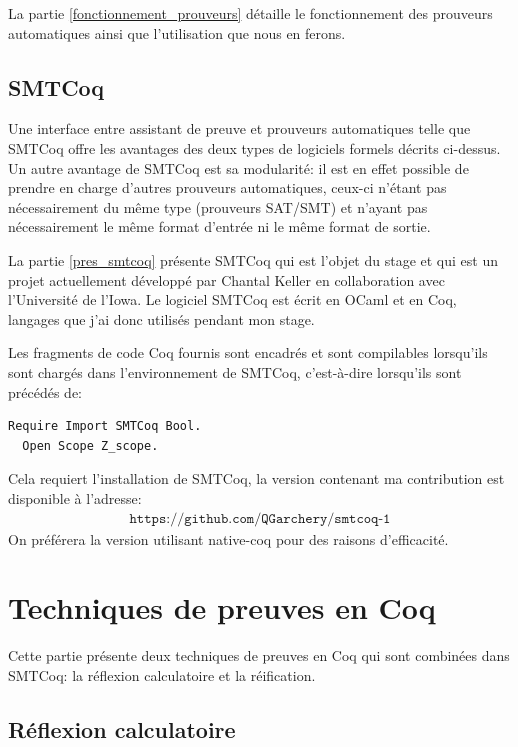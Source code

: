 \documentclass[11pt]{article}
\begin{document}
La partie \ref{fonctionnement_prouveurs} détaille le fonctionnement des prouveurs automatiques ainsi que l'utilisation que nous en ferons.


\subsection{SMTCoq}

Une interface entre assistant de preuve et prouveurs automatiques telle que SMTCoq offre les avantages des deux types de logiciels formels décrits ci-dessus. Un autre avantage de SMTCoq est sa modularité: il est en effet possible de prendre en charge d'autres prouveurs automatiques, ceux-ci n'étant pas nécessairement du même type (prouveurs SAT/SMT) et n'ayant pas nécessairement le même format d'entrée ni le même format de sortie. \medbreak


La partie \ref{pres_smtcoq} présente SMTCoq qui est l'objet du stage et qui est un projet actuellement développé par Chantal Keller en collaboration avec l'Université de l'Iowa. Le logiciel SMTCoq est écrit en OCaml et en Coq, langages que j'ai donc utilisés pendant mon stage. \medbreak

Les fragments de code Coq fournis sont encadrés et sont compilables lorsqu'ils sont chargés dans l'environnement de SMTCoq, c'est-à-dire lorsqu'ils sont précédés de:
\begin{lstlisting}[frame=single]
  Require Import SMTCoq Bool.
  Open Scope Z_scope.
\end{lstlisting}
Cela requiert l'installation de SMTCoq, la version contenant ma contribution est disponible à l'adresse:
\begin{align*}
    \texttt{https://github.com/QGarchery/smtcoq-1}
\end{align*}
On préférera la version utilisant native-coq \cite{native-coq} pour des raisons d'efficacité.


\newpage

\section{Techniques de preuves en Coq} \label{coq}

Cette partie présente deux techniques de preuves en Coq qui sont combinées dans SMTCoq: la réflexion calculatoire et la réification.


\subsection{Réflexion calculatoire}
\end{document}
